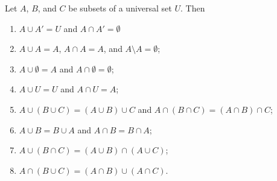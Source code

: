 \begin{prop}\label{proposition:sets:sets_theorem_set_ops}
Let $A$, $B$, and $C$ be subsets of a universal set $U$. Then
\begin{enumerate}
 
\item
$A \cup A' = U$ and $A \cap A' = \emptyset$

\item
$A \cup A = A$, $A \cap A = A$, and $A \setminus A = \emptyset$;
 
\item
$A \cup \emptyset = A$ and $A \cap \emptyset = \emptyset$;

\item
$A \cup U = U$ and $A \cap U = A$;
 
\item
$A \cup (B \cup C) = (A \cup B) \cup C$ and  $A \cap (B \cap C) = (A \cap B) \cap C$;
 
\item
$A \cup B = B \cup A$ and $A \cap B = B \cap A$;
 
\item
$A \cup (B \cap C) = (A \cup B) \cap (A \cup C)$;
 
\item
$A \cap (B \cup C) = (A \cap B) \cup (A \cap C)$.
 
\end{enumerate}
\end{prop}


